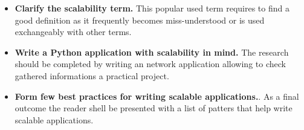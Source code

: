 \begin{itemize}
\item{\textbf{Clarify the scalability term.} This popular used term requires to find a good definition as it frequently becomes  miss-understood or is used exchangeably with other terms.}
\item{\textbf{Write a Python application with scalability in mind.} The research should be completed by writing an network application allowing to check gathered informations a practical project.}
\item{\textbf{Form few best practices for writing scalable applications.}. As a final outcome the reader shell be presented with a list of patters that help write scalable applications.}
\end{itemize}
 
